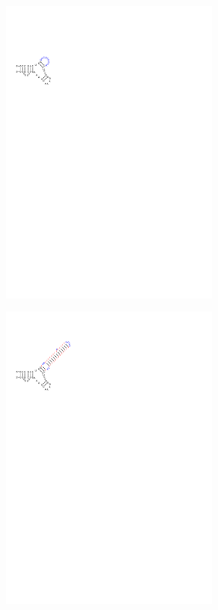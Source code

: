\begin{figure}[H]
\begin{subfigure}{0.3\textwidth}
    \includegraphics[clip, trim=1cm 21cm 14cm 2.5cm, width=0.85\textwidth]{../img/alg/insert/2/multibranch-del}
  \end{subfigure}
  \begin{subfigure}{0.3\textwidth}
    \includegraphics[clip, trim=1cm 21cm 14cm 2.5cm, width=0.85\textwidth]{../img/alg/insert/2/multibranch-del-ins}

\end{subfigure}
\end{figure}
